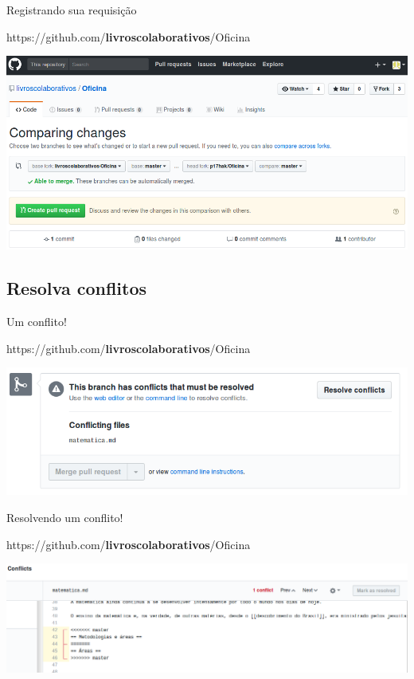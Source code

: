 \documentclass{beamer}
\begin{document}
\begin{frame}{Registrando sua requisição}
  \begin{center}
    https://github.com/{\bf livroscolaborativos}/Oficina

    \includegraphics[scale=0.3]{./figs/Create_pull_request_GitHub.png}
  \end{center}
\end{frame}

\subsection{Resolva conflitos}
\begin{frame}{Um conflito!}
  \begin{center}
    https://github.com/{\bf livroscolaborativos}/Oficina

    \includegraphics[scale=0.3]{./figs/Conflict_GitHub.png}
  \end{center}
\end{frame}

\begin{frame}{Resolvendo um conflito!}
  \begin{center}
    https://github.com/{\bf livroscolaborativos}/Oficina

    \includegraphics[scale=0.3]{./figs/Mark_as_resolved_GitHub.png}
  \end{center}
\end{frame}
\end{document}
